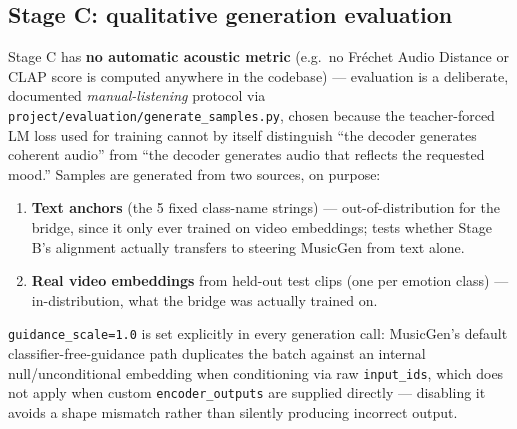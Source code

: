 \documentclass[11pt]{article}
\begin{document}
\subsection{Stage C: qualitative generation evaluation}
\label{sec:eval-stageC}
Stage C has \textbf{no automatic acoustic metric} (e.g.\ no Fr\'echet Audio Distance or CLAP score
is computed anywhere in the codebase) --- evaluation is a deliberate, documented
\emph{manual-listening} protocol via \texttt{project/evaluation/generate\_samples.py}, chosen
because the teacher-forced LM loss used for training cannot by itself distinguish ``the decoder
generates coherent audio'' from ``the decoder generates audio that reflects the requested mood.''
Samples are generated from two sources, on purpose:
\begin{enumerate}
  \item \textbf{Text anchors} (the 5 fixed class-name strings) --- out-of-distribution for the
  bridge, since it only ever trained on video embeddings; tests whether Stage B's alignment
  actually transfers to steering MusicGen from text alone.
  \item \textbf{Real video embeddings} from held-out test clips (one per emotion class) ---
  in-distribution, what the bridge was actually trained on.
\end{enumerate}
\texttt{guidance\_scale=1.0} is set explicitly in every generation call: MusicGen's default
classifier-free-guidance path duplicates the batch against an internal null/unconditional
embedding when conditioning via raw \texttt{input\_ids}, which does not apply when custom
\texttt{encoder\_outputs} are supplied directly --- disabling it avoids a shape mismatch rather than
silently producing incorrect output.
\end{document}
